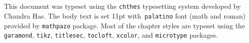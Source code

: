 \cleardoublepage
\pagestyle{empty}\hfill\vfill
{}

\section*{\scshape{}}
This document was typeset using the {\color{blue}\texttt{chthes}} typesetting
system developed by {\color{blue}Chandra Has}. The body text is set 11pt
with~{\color{red}\texttt{palatino}} font (math and roman) provided by {\color{red}\texttt{mathpazo}} package. Most of the chapter styles are typeset using the {\color{red}\texttt{garamond}}, {\color{red}\texttt{tikz}, \texttt{titlesec}, \texttt{tocloft}, \texttt{xcolor}}, and {\color{red}\texttt{microtype}} packages.
 




